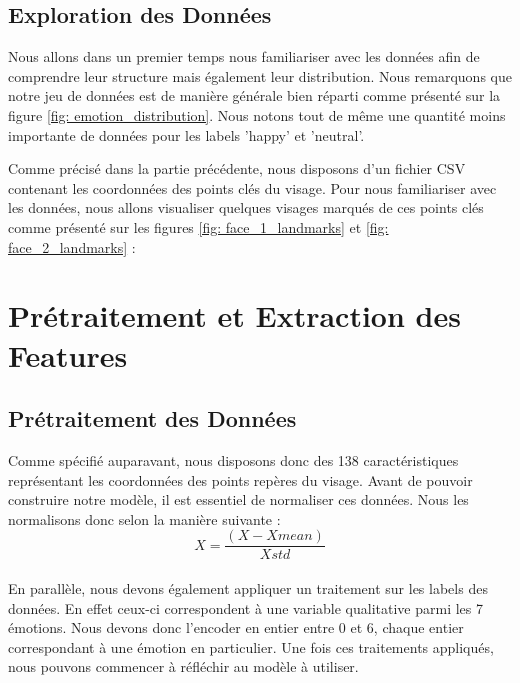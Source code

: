 \documentclass{rapport}
\begin{document}
\subsection{Exploration des Données}

Nous allons dans un premier temps nous familiariser avec les données afin de comprendre leur structure
mais également leur distribution. Nous remarquons que notre jeu de données est de manière générale bien
réparti comme présenté sur la figure \ref*{fig: emotion_distribution}. Nous notons tout de même une quantité
moins importante de données pour les labels 'happy' et 'neutral'.

Comme précisé dans la partie précédente, nous disposons d'un fichier CSV contenant les coordonnées des points clés du visage. Pour nous familiariser
avec les données, nous allons visualiser quelques visages marqués de ces points clés comme présenté sur les figures
\ref*{fig: face_1_landmarks} et \ref*{fig: face_2_landmarks} :


\section{Prétraitement et Extraction des Features}
\subsection{Prétraitement des Données}
Comme spécifié auparavant, nous disposons donc des 138 caractéristiques représentant les coordonnées des points repères du visage.
Avant de pouvoir construire notre modèle, il est essentiel de normaliser ces données.
Nous les normalisons donc selon la manière suivante \cite{kalapalaFacialExpressionRecognition2020} :\\

\begin{equation}
    X = \frac{(X - Xmean)} {Xstd}
\end{equation}\\

En parallèle, nous devons également appliquer un traitement sur les labels des données.
En effet ceux-ci correspondent à une variable qualitative parmi les 7 émotions.
Nous devons donc l'encoder en entier entre 0 et 6, chaque entier correspondant à une émotion en particulier.
Une fois ces traitements appliqués, nous pouvons commencer à réfléchir au modèle à utiliser.\\
\end{document}
